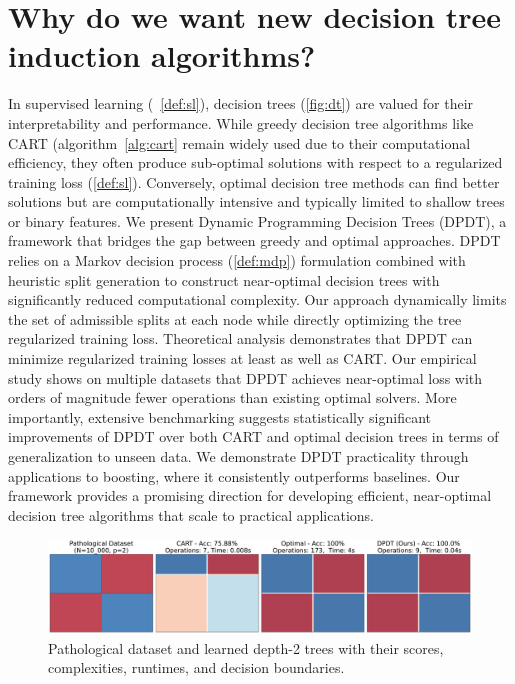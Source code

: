 \section{Why do we want new decision tree induction algorithms?}
In supervised learning (~\ref{def:sl}), decision trees (\ref{fig:dt}) are valued for their interpretability and performance. 
While greedy decision tree algorithms like CART (algorithm~\ref{alg:cart} \cite{breiman1984classification}remain widely used due to their computational efficiency, they often produce sub-optimal solutions with respect to a regularized training loss (\ref{def:sl}). 
Conversely, optimal decision tree methods can find better solutions but are computationally intensive and typically limited to shallow trees or binary features. We present Dynamic Programming Decision Trees (DPDT), a framework that bridges the gap between greedy and optimal approaches. 
DPDT relies on a Markov decision process (\ref{def:mdp}) formulation combined with heuristic split generation to construct near-optimal decision trees with significantly reduced computational complexity. 
Our approach dynamically limits the set of admissible splits at each node while directly optimizing the tree regularized training loss. Theoretical analysis demonstrates that DPDT can minimize regularized training losses at least as well as CART\@. 
Our empirical study shows on multiple datasets that DPDT achieves near-optimal loss with orders of magnitude fewer operations than existing optimal solvers. 
More importantly, extensive benchmarking suggests statistically significant improvements of DPDT over both CART and optimal decision trees in terms of generalization to unseen data. We demonstrate DPDT practicality through applications to boosting, where it consistently outperforms baselines. 
Our framework provides a promising direction for developing efficient, near-optimal decision tree algorithms that scale to practical applications.

\begin{figure}
    \includegraphics[width=\textwidth]{images/figures/patho_bounds_comparison_checkers.pdf}
    \caption{Pathological dataset and learned depth-2 trees with their scores, complexities, runtimes, and decision boundaries.}
    \label{fig:patho}
\end{figure}

